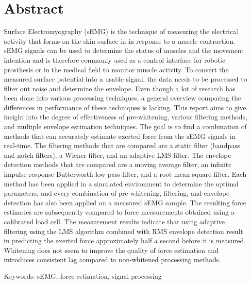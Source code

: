 \chapter*{Abstract}

Surface Electromyography (sEMG) is the technique of measuring the electrical activity that forms on the skin surface in in response to a muscle contraction. sEMG signals can be used to determine the status of muscles and the movement intention and is therefore commonly used as a control interface for robotic prosthesis or in the medical field to monitor muscle activity. To convert the measured surface potential into a usable signal, the data needs to be processed to filter out noise and determine the envelope. Even though a lot of research has been done into various processing techniques, a general overview comparing the differences in performance of these techniques is lacking. This report aims to give insight into the degree of effectiveness of pre-whitening, various filtering methods, and multiple envelope estimation techniques. The goal is to find a combination of methods that can accurately estimate exerted force from the sEMG signals in real-time. The filtering methods that are compared are a static filter (bandpass and notch filters), a Wiener filter, and an adaptive LMS filter. The envelope detection methods that are compared are a moving average filter, an infinite impulse response Butterworth low-pass filter, and a root-mean-square filter. Each method has been applied in a simulated environment to determine the optimal parameters, and every combination of pre-whitening, filtering, and envelope detection has also been applied on a measured sEMG sample. The resulting force estimates are subsequently compared to force measurements obtained using a calibrated load cell. The measurement results indicate that using adaptive filtering using the LMS algorithm combined with RMS envelope detection result in predicting the exerted force approximately half a second before it is measured. Whitening does not seem to improve the quality of force estimation and introduces consistent lag compared to non-whitened processing methods.

Keywords: sEMG, force estimation, signal processing
